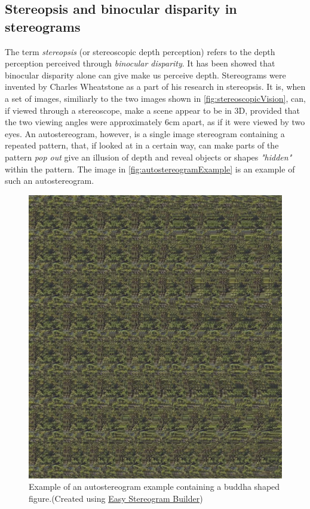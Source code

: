 \subsection{Stereopsis and binocular disparity in stereograms}\label{sec:stereograms}
The term \textit{stereopsis} (or stereoscopic depth perception) refers to the depth perception perceived through \textit{binocular disparity}\citep{sensationPerception,seeingInThreeDimensions}. It has been showed that binocular disparity alone can give make us perceive depth\citep{autostereograms}. Stereograms were invented by Charles Wheatstone as a part of his research in stereopsis. It is, when a set of images, similiarly to the two images shown in \autoref{fig:stereoscopicVision}, can, if viewed through a stereoscope, make a scene appear to be in 3D, provided that the two viewing angles were approximately 6cm apart, as if it were viewed by two eyes\citep[p.~212]{sensationPerception}. An autostereogram, however, is a single image stereogram containing a repeated pattern, that, if looked at in a certain way, can make parts of the pattern \textit{pop out} give an illusion of depth and reveal objects or shapes \textit{"hidden"} within the pattern\citep{autostereograms}. The image in \autoref{fig:autostereogramExample} is an example of such an autostereogram.

\begin{figure}[H]
	\centering
	\includegraphics[width=1\linewidth]{figure/Analysis/autostereogram.jpg}
	\caption{Example of an autostereogram example containing a buddha shaped figure.(Created using \href{http://www.easystereogrambuilder.com/3d-stereogram-maker.aspx}{\color{blue}Easy Stereogram Builder})}
	\label{fig:autostereogramExample}
\end{figure}

